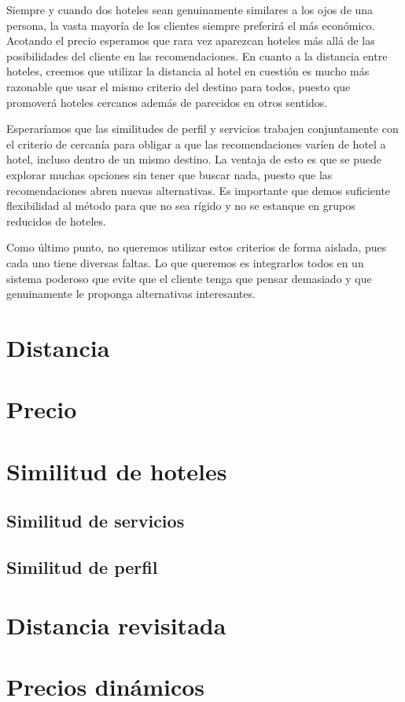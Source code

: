 \documentclass[12pt]{report}
\begin{document}
Siempre y cuando dos hoteles sean genuinamente similares a los ojos de una persona, la vasta mayoría de los clientes siempre preferirá el más económico. Acotando el precio esperamos que rara vez aparezcan hoteles más allá de las posibilidades del cliente en las recomendaciones. En cuanto a la distancia entre hoteles, creemos que utilizar la distancia al hotel en cuestión es mucho más razonable que usar el mismo criterio del destino para todos, puesto que promoverá hoteles cercanos además de parecidos en otros sentidos.

Esperaríamos que las similitudes de perfil y servicios trabajen conjuntamente con el criterio de cercanía para obligar a que las recomendaciones varíen de hotel a hotel, incluso dentro de un mismo destino. La ventaja de esto es que se puede explorar muchas opciones sin tener que buscar nada, puesto que las recomendaciones abren nuevas alternativas. Es importante que demos suficiente flexibilidad al método para que no sea rígido y no se estanque en grupos reducidos de hoteles.

Como último punto, no queremos utilizar estos criterios de forma aislada, pues cada uno tiene diversas faltas. Lo que queremos es integrarlos todos en un sistema poderoso que evite que el cliente tenga que pensar demasiado y que genuinamente le proponga alternativas interesantes.


\section{Distancia}
\section{Precio}
\section{Similitud de hoteles}
\subsection*{Similitud de servicios}
\subsection*{Similitud de perfil}
\section{Distancia revisitada}
\section{Precios dinámicos}
\end{document}
